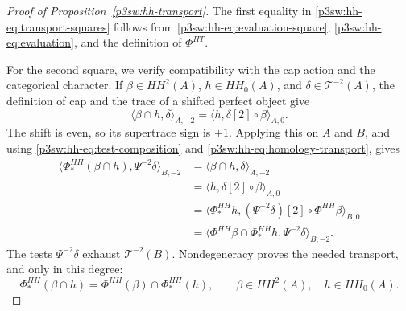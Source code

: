 \documentclass[11pt]{article}
\numberwithin{equation}{section}
\begin{document}
\begin{proof}[Proof of Proposition~\ref{p3sw:hh-transport}]
The first equality in
\eqref{p3sw:hh-eq:transport-squares} follows from
\eqref{p3sw:hh-eq:evaluation-square},
\eqref{p3sw:hh-eq:evaluation}, and the definition of \(\Phi^{HT}\).

For the second square, we verify compatibility with the cap action
and the categorical character.  If \(\beta\in HH^2(A)\), \(h\in HH_0(A)\),
and \(\delta\in\mathscr T^{-2}(A)\), the definition of cap and
the trace of a shifted perfect object give
\[
 \langle\beta\cap h,\delta\rangle_{A,-2}
       =\langle h,\delta[2]\circ\beta\rangle_{A,0}.
\]
The shift is even, so its supertrace sign is \(+1\).  Applying this
on \(A\) and \(B\), and using
\eqref{p3sw:hh-eq:test-composition} and
\eqref{p3sw:hh-eq:homology-transport}, gives
\[
\begin{split}
 \langle\Phi_*^{HH}(\beta\cap h),\Psi^{-2}\delta\rangle_{B,-2}
  &=\langle\beta\cap h,\delta\rangle_{A,-2}\\
  &=\langle h,\delta[2]\circ\beta\rangle_{A,0}\\
  &=\langle\Phi_*^{HH}h,
             (\Psi^{-2}\delta)[2]\circ\Phi^{HH}\beta\rangle_{B,0}\\
  &=\langle\Phi^{HH}\beta\cap\Phi_*^{HH}h,
                                      \Psi^{-2}\delta\rangle_{B,-2}.
\end{split}
\]
The tests \(\Psi^{-2}\delta\) exhaust \(\mathscr T^{-2}(B)\).
Nondegeneracy proves the needed transport, and only in this degree:
\begin{equation}
 \Phi_*^{HH}(\beta\cap h)
       =\Phi^{HH}(\beta)\cap\Phi_*^{HH}(h),
       \qquad \beta\in HH^2(A),\quad h\in HH_0(A).
\label{p3sw:hh-eq:cap-transport}
\end{equation}


\end{proof}
\end{document}

